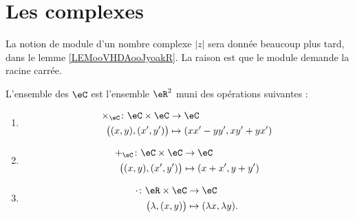 \section{Les complexes}

La notion de module d'un nombre complexe \( | z |\) sera donnée beaucoup plus tard, dans le lemme \ref{LEMooVHDAooJyoakR}. La raison est que le module demande la racine carrée.

\begin{definition}
	L'ensemble des  \( \eC\) est l'ensemble \( \eR^2\) muni des opérations suivantes :
	\begin{enumerate}
		\item
		      \begin{equation}        \label{EQooIJWOooZBiKEW}
			      \begin{aligned}
				      \times_{\eC}\colon \eC\times \eC & \to \eC                    \\
				      \big( (x,y),(x',y') \big)        & \mapsto (xx'-yy', xy'+yx')
			      \end{aligned}
		      \end{equation}
		\item
		      \begin{equation}
			      \begin{aligned}
				      +_{\eC}\colon \eC\times \eC & \to \eC              \\
				      \big( (x,y),(x',y') \big)   & \mapsto (x+x', y+y')
			      \end{aligned}
		      \end{equation}
		\item
		      \begin{equation}
			      \begin{aligned}
				      \cdot\colon \eR\times \eC & \to \eC                         \\
				      \big( \lambda,(x,y) \big) & \mapsto (\lambda x, \lambda y).
			      \end{aligned}
		      \end{equation}
	\end{enumerate}
\end{definition}

